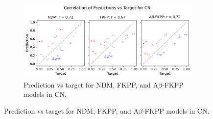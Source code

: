 \begin{figure}[tbp]
\begin{tcolorbox}
        \vspace{1.5em} %
        
        \begin{subfigure}{\linewidth}
            \centering
            \includegraphics[width=\linewidth]{figures/correlation_prediction_vs_target_cn.pdf}
            \caption{Prediction vs target for NDM, FKPP, and A$\beta$-FKPP models in CN.}
            \label{fig:correlation_plots}
        \end{subfigure}
        
        \vspace{1.5em} %
        

\end{tcolorbox}
\end{figure}
